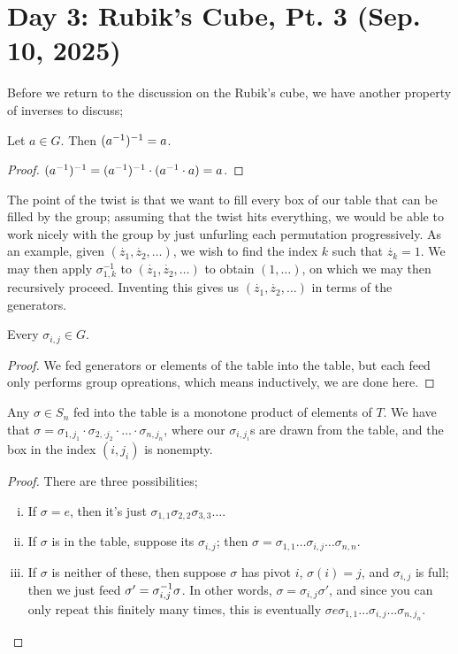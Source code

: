 \section{Day 3: Rubik's Cube, Pt. 3 (Sep. 10, 2025)}
Before we return to the discussion on the Rubik's cube, we have another property of inverses to discuss;
\begin{theorem}
    Let $a \in G$. Then $(a^{-1})^{-1} = a$.
\end{theorem}
\begin{proof}
    $(a^{-1})^{-1} = (a^{-1})^{-1} \cdot (a^{-1} \cdot a) = a$.
\end{proof}
\noindent The point of the twist is that we want to fill every box of our table that can be filled by the group; assuming that the twist hits everything, we would be able to work nicely with the group by just unfurling each permutation progressively. As an example, given $(\dot{z_1}, \dot{z_2}, \dots)$, we wish to find the index $k$ such that $\dot{z_k} = 1$. We may then apply $\sigma_{1,k}^{-1}$ to $(\dot{z_1}, \dot{z_2}, \dots)$ to obtain $(1, \dots)$, on which we may then recursively proceed. Inventing this gives us $(\dot{z_1}, \dot{z_2}, \dots)$ in terms of the generators.
\begin{lemma}
    Every $\sigma_{i, j} \in G$.
\end{lemma}
\begin{proof}
    We fed generators or elements of the table into the table, but each feed only performs group opreations, which means inductively, we are done here.
\end{proof}
\begin{lemma}
    Any $\sigma \in S_n$ fed into the table is a monotone product of elements of $T$. We have that $\sigma = \sigma_{1, j_1} \cdot \sigma_{2, \cdot{j_2}} \cdot \dots \cdot \sigma_{n, j_n}$, where our $\sigma_{i, j_i}$s are drawn from the table, and the box in the index $(i, j_i)$ is nonempty.
\end{lemma}
\begin{proof}
    There are three possibilities;
    \begin{enumerate}[(i)]
        \item If $\sigma = e$, then it's just $\sigma_{1,1} \sigma_{2,2} \sigma_{3,3} \dots$.
        \item If $\sigma$ is in the table, suppose its $\sigma_{i,j}$; then $\sigma = \sigma_{1,1} \dots \sigma_{i,j} \dots \sigma_{n,n}$. 
        \item If $\sigma$ is neither of these, then suppose $\sigma$ has pivot $i$, $\sigma(i) = j$, and $\sigma_{i,j}$ is full; then we just feed $\sigma' = \sigma_{i,j}^{-1} \sigma$. In other words, $\sigma = \sigma_{i,j} \sigma'$, and since you can only repeat this finitely many times, this is eventually $\sigma e \sigma_{1,1} \dots \sigma_{i,j} \dots \sigma_{n,j_n}$. \qedhere
    \end{enumerate}
\end{proof}
